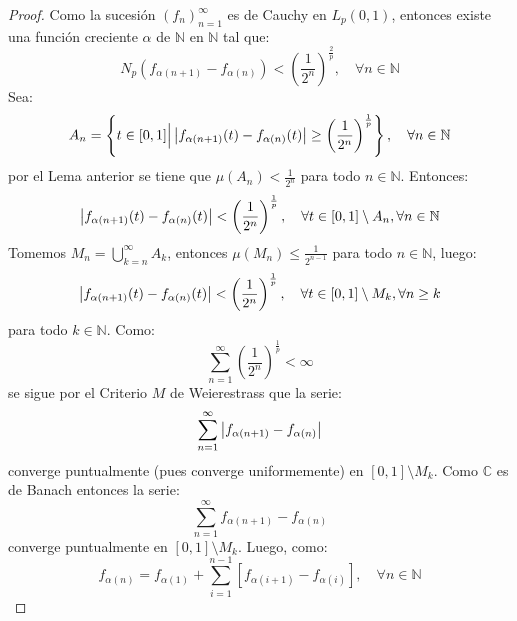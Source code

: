 \documentclass[twoside,12pt,a4 paper,openright]{book}
\begin{document}
\begin{enumerate}
    \begin{proof}
        Como la sucesi\'on $\left(f_{n} \right)_{ n=1}^\infty$ es de Cauchy en $L_p(0,1)$, entonces existe una funci\'on creciente $\alpha$ de $\mathbb{N}$ en $\mathbb{N}$ tal que:
        \begin{equation*}
            N_p(f_{\alpha(n+1)}-f_{\alpha(n)})<\left(\frac{1}{2^n}\right)^{\frac{2}{p}},\quad\forall n\in\mathbb{N}
        \end{equation*}
        Sea:
        \begin{equation*}
            A_n=\left\{t\in[0,1]\Big|\left|f_{\alpha(n+1)}(t)-f_{\alpha(n)}(t)\right|\geq\left(\frac{1}{2^n}\right)^{\frac{1}{p}} \right\},\quad\forall n\in\mathbb{N}
        \end{equation*}
        por el Lema anterior se tiene que $\mu(A_n)<\frac{1}{2^n}$ para todo $n\in\mathbb{N}$. Entonces:
        \begin{equation*}
            \left|f_{\alpha(n+1)}(t)-f_{\alpha(n)}(t)\right|<\left(\frac{1}{2^n}\right)^{\frac{1}{p}},\quad\forall t\in[0,1]\setminus A_n,\forall n\in\mathbb{N}
        \end{equation*}
        Tomemos $M_n=\bigcup_{k=n}^\infty A_k$, entonces $\mu(M_n)\leq\frac{1}{2^{n-1}}$ para todo $n\in\mathbb{N}$, luego:
        \begin{equation*}
            \left|f_{\alpha(n+1)}(t)-f_{\alpha(n)}(t)\right|<\left(\frac{1}{2^n}\right)^{\frac{1}{p}},\quad\forall t\in[0,1]\setminus M_k,\forall n\geq k
        \end{equation*}
        para todo $k\in\mathbb{N}$. Como:
        \begin{equation*}
            \sum_{ n=1}^\infty\left(\frac{1}{2^n}\right)^{\frac{1}{p}}<\infty
        \end{equation*}
        se sigue por el Criterio $M$ de Weierestrass que la serie:
        \begin{equation*}
            \sum_{ n=1}^\infty\left|f_{\alpha(n+1)}-f_{\alpha(n)}\right|
        \end{equation*}
        converge puntualmente (pues converge uniformemente) en $[0,1]\setminus M_k$. Como $\mathbb{C}$ es de Banach entonces la serie:
        \begin{equation*}
            \sum_{ n=1}^\infty f_{\alpha(n+1)}-f_{\alpha(n)}
        \end{equation*}
        converge puntualmente en $[0,1]\setminus M_k$. Luego, como:
        \begin{equation*}
            f_{\alpha(n)}=f_{\alpha(1)}+\sum_{i=1}^{n-1}[f_{\alpha( i+1)}-f_{\alpha(i)}],\quad\forall n\in\mathbb{N}

\end{equation*}
\end{proof}
\end{enumerate}
\end{document}
